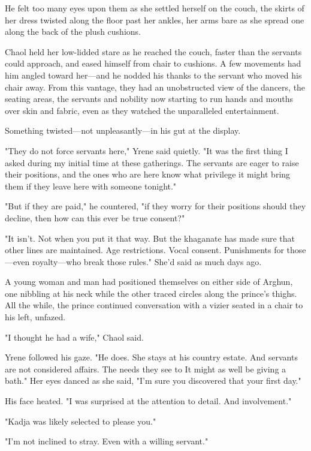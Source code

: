 He felt too many eyes upon them as she settled herself on the couch, the skirts of her dress twisted along the floor past her ankles, her arms bare as she spread one along the back of the plush cushions.

Chaol held her low-lidded stare as he reached the couch, faster than the servants could approach, and eased himself from chair to cushions. A few movements had him angled toward her---and he nodded his thanks to the servant who moved his chair away. From this vantage, they had an unobstructed view of the dancers, the seating areas, the servants and nobility now starting to run hands and mouths over skin and fabric, even as they watched the unparalleled entertainment.

Something twisted---not unpleasantly---in his gut at the display.

"They do not force servants here," Yrene said quietly. "It was the first thing I asked during my initial time at these gatherings. The servants are eager to raise their positions, and the ones who are here know what privilege it might bring them if they leave here with someone tonight."

"But if they are paid," he countered, "if they worry for their positions should they decline, then how can this ever be true consent?"

"It isn't. Not when you put it that way. But the khaganate has made sure that other lines are maintained. Age restrictions. Vocal consent. Punishments for those---even royalty---who break those rules." She'd said as much days ago.

A young woman and man had positioned themselves on either side of Arghun, one nibbling at his neck while the other traced circles along the prince's thighs. All the while, the prince continued conversation with a vizier seated in a chair to his left, unfazed.

"I thought he had a wife," Chaol said.

Yrene followed his gaze. "He does. She stays at his country estate. And servants are not considered affairs. The needs they see to  It might as well be giving a bath." Her eyes danced as she said, "I'm sure you discovered that your first day."

His face heated. "I was  surprised at the attention to detail. And involvement."

"Kadja was likely selected to please you."

"I'm not inclined to stray. Even with a willing servant."


